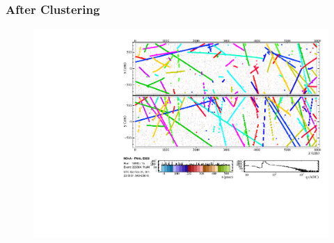 \documentclass[10pt,professionalfonts,xcolor=table]{beamer}
\begin{document}
\frame
{
  \frametitle{After Clustering}

 \begin{figure} \includegraphics[height=0.9\textwidth, angle=-90]{figures/evd_steps/evd_slice.pdf} \end{figure}
}
\end{document}
